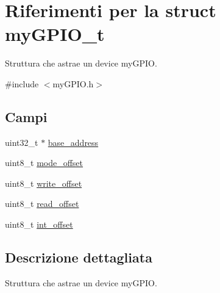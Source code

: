 \hypertarget{structmy_g_p_i_o__t}{\section{Riferimenti per la struct my\+G\+P\+I\+O\+\_\+t}
\label{structmy_g_p_i_o__t}
}


Struttura che astrae un device my\+G\+P\+I\+O.  




{\ttfamily \#include $<$my\+G\+P\+I\+O.\+h$>$}

\subsection*{Campi}
\begin{DoxyCompactItemize}
\item 
uint32\+\_\+t $\ast$ \hyperlink{structmy_g_p_i_o__t_a79c591d5fa42efdf86abd98347fece90}{base\+\_\+address}
\item 
uint8\+\_\+t \hyperlink{structmy_g_p_i_o__t_ad21272e5293d7c1e7ccafe35a2e129d1}{mode\+\_\+offset}
\item 
uint8\+\_\+t \hyperlink{structmy_g_p_i_o__t_abb65e5db6d4ad365a7c48d00e4af1f78}{write\+\_\+offset}
\item 
uint8\+\_\+t \hyperlink{structmy_g_p_i_o__t_ab65acde67dc46f1d163e2ee468420b48}{read\+\_\+offset}
\item 
uint8\+\_\+t \hyperlink{structmy_g_p_i_o__t_a85774c49d56d05c7daa0803bf49654c4}{int\+\_\+offset}
\end{DoxyCompactItemize}


\subsection{Descrizione dettagliata}
Struttura che astrae un device my\+G\+P\+I\+O. 

